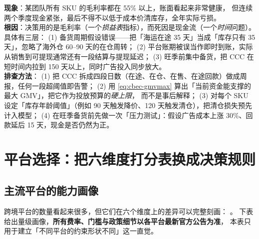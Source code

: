 \begin{pitfall}
\textbf{现象}：某团队所有 SKU 的毛利率都在 55\% 以上，账面看起来非常健康，
但连续两个季度现金紧张，最后不得不以低于成本价清库存，全年实际亏损。
\\
\textbf{根因}：决策用的是毛利率（一个\emph{损益表}指标），而死因是现金流（一个\emph{时间}问题）。
具体有三层：
(1) 备货周期假设错误——把「海运在途 35 天」当成「库存只有 35 天」，忽略了海外仓 60--90 天的在仓周转；
(2) 平台账期被误当作即时到账，实际从销售到可提现通常还有一段结算与提现延迟；
(3) 旺季前集中备货，把 CCC 在短时间内拉到 150 天以上，同时广告投入同步放大。
\\
\textbf{排查方法}：
(1) 把 CCC 拆成四段日数（在途、在仓、在售、在途回款）做成周报，任何一段超阈值即告警；
(2) 用 \cref{eq:cbec-gmvmax} 算出「当前资金能支撑的最大 GMV」，把它作为投放预算的\emph{硬上限}，
而不是事后解释；
(3) 对每个 SKU 设定「库存年龄阈值」（例如 90 天触发降价、120 天触发清仓），把清仓损失预先计入模型；
(4) 在旺季备货前先做一次「压力测试」：假设广告成本上涨 30\%、回款延后 15 天，现金是否仍然为正。
\end{pitfall}

\section{平台选择：把六维度打分表换成决策规则}
\label{sec:cbec-platform}

\subsection{主流平台的能力画像}

跨境平台的数量看起来很多，但它们在六个维度上的差异可以完整刻画：
。
下表给出量级画像，\textbf{所有费率、门槛与政策细节以各平台最新官方公告为准}，
本表只用于建立「不同平台的约束形状不同」这一直觉。


